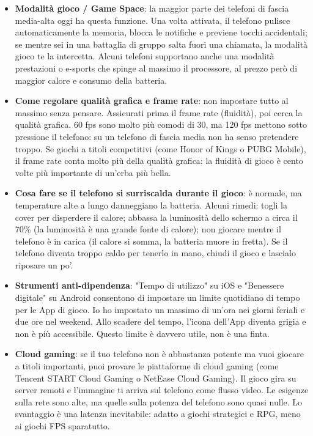 \begin{itemize}
  \item \textbf{Modalità gioco / Game Space}: la maggior parte dei telefoni di fascia media-alta oggi ha questa funzione. Una volta attivata, il telefono pulisce automaticamente la memoria, blocca le notifiche e previene tocchi accidentali; se mentre sei in una battaglia di gruppo salta fuori una chiamata, la modalità gioco te la intercetta. Alcuni telefoni supportano anche una modalità prestazioni o e-sports che spinge al massimo il processore, al prezzo però di maggior calore e consumo della batteria.
  \item \textbf{Come regolare qualità grafica e frame rate}: non impostare tutto al massimo senza pensare. Assicurati prima il frame rate (fluidità), poi cerca la qualità grafica. 60 fps sono molto più comodi di 30, ma 120 fps mettono sotto pressione il telefono: su un telefono di fascia media non ha senso pretendere troppo. Se giochi a titoli competitivi (come Honor of Kings o PUBG Mobile), il frame rate conta molto più della qualità grafica: la fluidità di gioco è cento volte più importante di un'erba più bella.
  \item \textbf{Cosa fare se il telefono si surriscalda durante il gioco}: è normale, ma temperature alte a lungo danneggiano la batteria. Alcuni rimedi: togli la cover per disperdere il calore; abbassa la luminosità dello schermo a circa il 70\% (la luminosità è una grande fonte di calore); non giocare mentre il telefono è in carica (il calore si somma, la batteria muore in fretta). Se il telefono diventa troppo caldo per tenerlo in mano, chiudi il gioco e lascialo riposare un po'.
  \item \textbf{Strumenti anti-dipendenza}: "Tempo di utilizzo" su iOS e "Benessere digitale" su Android consentono di impostare un limite quotidiano di tempo per le App di gioco. Io ho impostato un massimo di un'ora nei giorni feriali e due ore nel weekend. Allo scadere del tempo, l'icona dell'App diventa grigia e non è più accessibile. Questo limite è davvero utile, non è una finta.
  \item \textbf{Cloud gaming}: se il tuo telefono non è abbastanza potente ma vuoi giocare a titoli importanti, puoi provare le piattaforme di cloud gaming (come Tencent START Cloud Gaming o NetEase Cloud Gaming). Il gioco gira su server remoti e l'immagine ti arriva sul telefono come flusso video. Le esigenze sulla rete sono alte, ma quelle sulla potenza del telefono sono quasi nulle. Lo svantaggio è una latenza inevitabile: adatto a giochi strategici e RPG, meno ai giochi FPS sparatutto.
\end{itemize}

